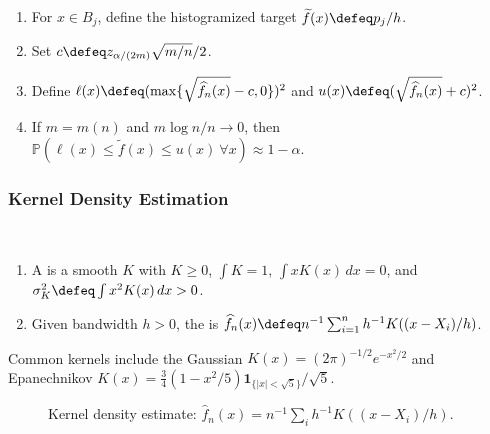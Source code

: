 \begin{method} \label{meth:histogram-confidence-envelope} 
\begin{enumerate}[label=(\roman*)]
\setlength{\itemsep}{0pt}
\item For $x\in B_j$, define the histogramized target $\widetilde f(x)\defeq p_j/h$.
\item Set $c\defeq z_{\alpha/(2m)}\sqrt{m/n}/2$.
\item Define $\ell(x)\defeq(\max\{\sqrt{\widehat f_n(x)}-c,0\})^2$ and $u(x)\defeq(\sqrt{\widehat f_n(x)}+c)^2$.
\item If $m=m(n)$ and $m\log n/n\to0$, then $\mathbb{P}(\ell(x)\leq\widetilde f(x)\leq u(x)\ \forall x)\approx1-\alpha$.
\end{enumerate}
\end{method}

\subsubsection{Kernel Density Estimation}

\begin{definition} \label{def:kernel-density-estimator} \\
\begin{enumerate}[label=(\roman*)]
\setlength{\itemsep}{0pt}
\item A  is a smooth $K$ with $K\geq0$, $\int K=1$, $\int xK(x)\,dx=0$, and $\sigma_K^2\defeq\int x^2K(x)\,dx>0$.
\item Given bandwidth $h>0$, the  is $\widehat f_n(x)\defeq n^{-1}\sum_{i=1}^{n}h^{-1}K((x-X_i)/h)$.
\end{enumerate}
Common kernels include the Gaussian $K(x)=(2\pi)^{-1/2}e^{-x^2/2}$ and Epanechnikov $K(x)=\frac34(1-x^2/5)\mathbf{1}_{\{|x|<\sqrt5\}}/\sqrt5$.
\end{definition}

\begin{figure}[H]
  \centering
  
  \caption{Kernel density estimate: $\widehat f_n(x)=n^{-1}\sum_i h^{-1}K((x-X_i)/h)$.}
  \label{fig:kernel-density-lumps}
\end{figure}

